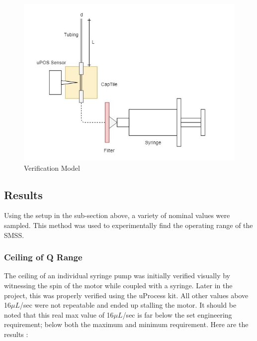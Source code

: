 \documentclass[journal]{IEEEtran}
\begin{document}
        \begin{figure}[H]
            \centering
            \includegraphics[scale = 0.55]{verif_diagram}
            \caption{Verification Model}
            \label{fig:verif_diagram}
        \end{figure}
        
    \subsection{Results}
        Using the setup in the sub-section above, a variety of nominal values were sampled. This method was used to experimentally find the operating range of the SMSS.
        
        \subsubsection{Ceiling of Q Range}
            The ceiling of an individual syringe pump was initially verified visually by witnessing the spin of the motor while coupled with a syringe. Later in the project, this was properly verified using the uProcess kit. All other values above 16\(\mu L\)/sec were not repeatable and ended up stalling the motor. It should be noted that this real max value of 16\(\mu L\)/sec is far below the set engineering requirement; below both the maximum and minimum requirement. Here are the results :
            
\end{document}
